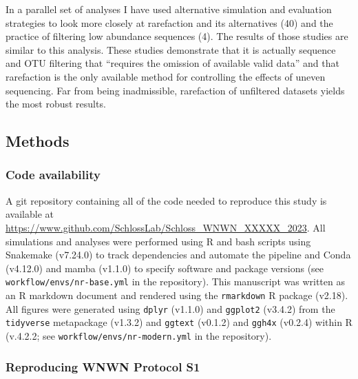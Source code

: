 \documentclass[
]{article}
\begin{document}
In a parallel set of analyses I have used alternative simulation and
evaluation strategies to look more closely at rarefaction and its
alternatives (40) and the practice of filtering low abundance sequences
(4). The results of those studies are similar to this analysis. These
studies demonstrate that it is actually sequence and OTU filtering that
``requires the omission of available valid data'' and that rarefaction
is the only available method for controlling the effects of uneven
sequencing. Far from being inadmissible, rarefaction of unfiltered
datasets yields the most robust results.

\hypertarget{methods}{%
\subsection{Methods}\label{methods}}

\hypertarget{code-availability}{%
\subsubsection{Code availability}\label{code-availability}}

A git repository containing all of the code needed to reproduce this
study is available at
\url{https://www.github.com/SchlossLab/Schloss_WNWN_XXXXX_2023}. All
simulations and analyses were performed using R and bash scripts using
Snakemake (v7.24.0) to track dependencies and automate the pipeline and
Conda (v4.12.0) and mamba (v1.1.0) to specify software and package
versions (see \texttt{workflow/envs/nr-base.yml} in the repository).
This manuscript was written as an R markdown document and rendered using
the \texttt{rmarkdown} R package (v2.18). All figures were generated
using \texttt{dplyr} (v1.1.0) and \texttt{ggplot2} (v3.4.2) from the
\texttt{tidyverse} metapackage (v1.3.2) and \texttt{ggtext} (v0.1.2) and
\texttt{ggh4x} (v0.2.4) within R (v.4.2.2; see
\texttt{workflow/envs/nr-modern.yml} in the repository).

\hypertarget{reproducing-wnwn-protocol-s1}{%
\subsubsection{Reproducing WNWN Protocol
S1}\label{reproducing-wnwn-protocol-s1}}
\end{document}
